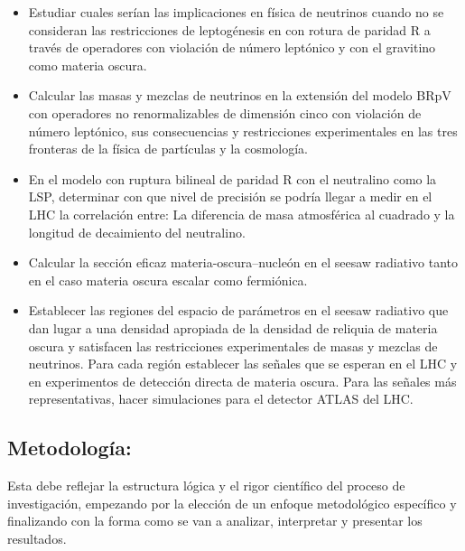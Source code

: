\begin{itemize}
\item
\begin{gravitinodm}
  Estudiar cuales serían las implicaciones en física de neutrinos
  cuando no se consideran las restricciones de leptogénesis en con
  rotura de paridad R a través de operadores con violación de número
  leptónico y con el gravitino como materia oscura.
\end{gravitinodm}

\item 
\begin{bbrpvlhc}
  Calcular las masas y mezclas de neutrinos en la extensión del modelo
  BRpV con operadores no renormalizables de dimensión cinco con
  violación de número leptónico, sus consecuencias y restricciones
  experimentales en las tres fronteras de la física de partículas y la
  cosmología.
\end{bbrpvlhc}
\item 
\begin{brpvlhc}  
  En el modelo con ruptura bilineal de paridad R con el neutralino
  como la LSP, determinar con que nivel de precisión se podría llegar
  a medir en el LHC la correlación entre: La diferencia de masa
  atmosférica al cuadrado y la longitud de decaimiento del neutralino.
\end{brpvlhc}

\item 
\begin{darkmatter}
  Calcular la sección eficaz materia-oscura--nucleón en el seesaw
  radiativo tanto en el caso materia oscura escalar como fermiónica.
\end{darkmatter}

\item 
\begin{darkmatter}
  Establecer las regiones del espacio de parámetros en el seesaw
  radiativo que dan lugar a una densidad apropiada de la densidad de
  reliquia de materia oscura y satisfacen las restricciones
  experimentales de masas y mezclas de neutrinos. Para cada región
  establecer las señales que se esperan en el LHC y en experimentos de
  detección directa de materia oscura.  Para las señales más
  representativas, hacer simulaciones para el detector ATLAS del LHC.
\end{darkmatter}




\end{itemize}

\subsection{Metodología:                                   }
\begin{instrucciones}
  Esta debe reflejar la estructura lógica y el rigor científico del
  proceso de investigación, empezando por la elección de un enfoque
  metodológico específico y finalizando con la forma como se van a
  analizar, interpretar y presentar los resultados.
\end{instrucciones}

